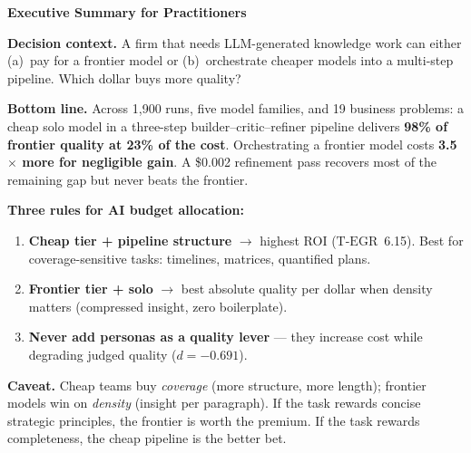 \documentclass[12pt,a4paper]{article}
\newcommand{\TEGR}{\ensuremath{\text{T-EGR}}}
\begin{document}
\begin{mdframed}[style=execsummary]
\textbf{Executive Summary for Practitioners}

\medskip
\noindent\textbf{Decision context.} A firm that needs LLM-generated knowledge
work can either (a)~pay for a frontier model or (b)~orchestrate cheaper models
into a multi-step pipeline. Which dollar buys more quality?

\medskip
\noindent\textbf{Bottom line.} Across 1{,}900 runs, five model families, and 19
business problems: a cheap solo model in a three-step builder--critic--refiner
pipeline delivers \textbf{98\% of frontier quality at 23\% of the cost}.
Orchestrating a frontier model costs \textbf{3.5$\times$ more for negligible
gain}. A \$0.002 refinement pass recovers most of the remaining gap but never
beats the frontier.

\medskip
\noindent\textbf{Three rules for AI budget allocation:}
\begin{enumerate}[leftmargin=*,nosep]
  \item \textbf{Cheap tier + pipeline structure} $\to$ highest ROI
    ($\TEGR$~6.15). Best for coverage-sensitive tasks: timelines, matrices,
    quantified plans.
  \item \textbf{Frontier tier + solo} $\to$ best absolute quality per dollar
    when density matters (compressed insight, zero boilerplate).
  \item \textbf{Never add personas as a quality lever} --- they increase cost
    while degrading judged quality ($d = -0.691$).
\end{enumerate}

\medskip
\noindent\textbf{Caveat.} Cheap teams buy \emph{coverage} (more structure, more
length); frontier models win on \emph{density} (insight per paragraph). If the
task rewards concise strategic principles, the frontier is worth the premium.
If the task rewards completeness, the cheap pipeline is the better bet.
\end{mdframed}

\end{document}
